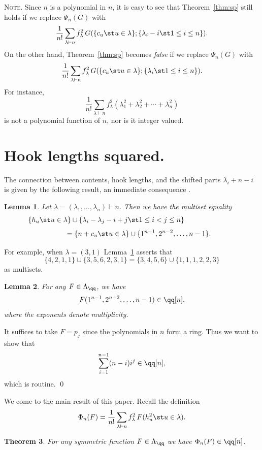 \documentclass[12pt]{article}
\newtheorem{theorem}{Theorem}[section]
\newtheorem{lemma}[theorem]{Lemma}
\theoremstyle{definition}
\theoremstyle{remark}
\begin{document}
\medskip
\textsc{Note.} Since $n$ is a polynomial in $n$, it is easy to see
that Theorem~\ref{thm:sp} still holds if we replace $\Psi_n(G)$ with
  $$ \frac{1}{n!}\sum_{\lambda\vdash n}
    f_\lambda^2\,G(\{c_u\st u\in\lambda\}; \{ \lambda_i-i\st 1\leq
    i\leq n\}). $$
On the other hand, Theorem~\ref{thm:sp} becomes \emph{false} if we
replace $\Psi_n(G)$ with
    $$ \frac{1}{n!}\sum_{\lambda\vdash n} f_\lambda^2\, G(\{c_u\st
      u\in\lambda\}; \{\lambda_i\st 1\leq i\leq n\}). $$
For instance,
    $$ \frac{1}{n!}\sum_{\lambda\vdash n}
  f_\lambda^2(\lambda_1^2+\lambda_2^2+\cdots+\lambda_n^2) $$
is not a polynomial function of $n$, nor is it integer valued.

\section{Hook lengths squared.} \label{sec4}
The connection between contents, hook lengths, and the shifted parts
$\lambda_i+n-i$ is given by the following result, an
immediate consequence \cite[Lemma~7.21.1]{ec2}.

\begin{lemma} \label{lemma:mset}
Let $\lambda=(\lambda_1,\dots,\lambda_n)\vdash n$. Then we have the
multiset equality
  $$ \hspace{-1in} \{ h_u\st u\in \lambda\} \cup
  \{\lambda_i-\lambda_j-i+j\st 1\leq 
       i<j\leq n\} $$
  $$ \qquad = \{n+c_u\st u\in\lambda\}\cup
         \{1^{n-1},2^{n-2},\dots,n-1\}. $$
\end{lemma}

For example, when $\lambda=(3,1)$ Lemma~\ref{lemma:mset} asserts that
  $$ \{4,2,1,1\}\cup\{3,5,6,2,3,1\}=\{3,4,5,6\}\cup\{1,1,1,2,2,3\} $$
as multisets.

\begin{lemma} \label{lemma:mupo}
For any $F\in\Lambda_\qq$, we have
  $$ F(1^{n-1},2^{n-2},\dots,n-1)\in \qq[n], $$
where the exponents denote multiplicity.
\end{lemma}

\proof It suffices to take $F=p_j$ since the polynomials in $n$ form a
ring. Thus we want to show that
  $$ \sum_{i=1}^{n-1} (n-i)i^j \in\qq[n], $$
which is routine.
\qed

\medskip
We come to the main result of this paper. Recall the definition
  $$ \Phi_n(F) = \frac{1}{n!}\sum_{\lambda\vdash n} f_\lambda^2\,
            F(h_u^2\st u\in\lambda). $$

\begin{theorem} \label{thm:main}
For any symmetric function $F\in\Lambda_\qq$ we have $\Phi_n(F)
\in\qq[n]$. 
\end{theorem}
\end{document}
